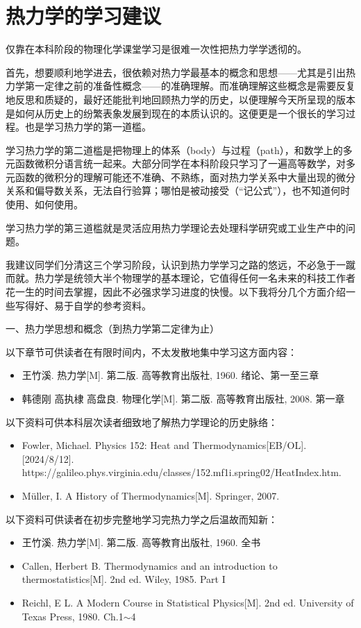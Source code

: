 \documentclass[main.tex]{subfiles}
\begin{document}
\section{热力学的学习建议}\label{I.1 learning_advices}
仅靠在本科阶段的物理化学课堂学习是很难一次性把热力学学透彻的。

首先，想要顺利地学进去，很依赖对热力学最基本的概念和思想——尤其是引出热力学第一定律之前的准备性概念——的准确理解。而准确理解这些概念是需要反复地反思和质疑的，最好还能批判地回顾热力学的历史，以便理解今天所呈现的版本是如何从历史上的纷繁表象发展到现在的本质认识的。这便更是一个很长的学习过程。也是学习热力学的第一道槛。

学习热力学的第二道槛是把物理上的体系（body）与过程（path），和数学上的多元函数微积分语言统一起来。大部分同学在本科阶段只学习了一遍高等数学，对多元函数的微积分的理解可能还不准确、不熟练，面对热力学关系中大量出现的微分关系和偏导数关系，无法自行验算；哪怕是被动接受（“记公式”），也不知道何时使用、如何使用。

学习热力学的第三道槛就是灵活应用热力学理论去处理科学研究或工业生产中的问题。

我建议同学们分清这三个学习阶段，认识到热力学学习之路的悠远，不必急于一蹴而就。热力学是统领大半个物理学的基本理论，它值得任何一名未来的科技工作者花一生的时间去掌握，因此不必强求学习进度的快慢。以下我将分几个方面介绍一些写得好、易于自学的参考资料。

一、热力学思想和概念（到热力学第二定律为止）

以下章节可供读者在有限时间内，不太发散地集中学习这方面内容：
\begin{itemize}
    \item 王竹溪. 热力学[M]. 第二版. 高等教育出版社, 1960. 绪论、第一至三章
    \item 韩德刚 高执棣 高盘良. 物理化学[M]. 第二版. 高等教育出版社, 2008. 第一章
\end{itemize}
以下资料可供本科层次读者细致地了解热力学理论的历史脉络：
\begin{itemize}
    \item Fowler, Michael. Physics 152: Heat and Thermodynamics[EB/OL]. [2024/8/12]. https://galileo.phys.virginia.edu/classes/152.mf1i.spring02/HeatIndex.htm.
    \item Müller, I. A History of Thermodynamics[M]. Springer, 2007.
\end{itemize}
以下资料可供读者在初步完整地学习完热力学之后温故而知新：
\begin{itemize}
    \item 王竹溪. 热力学[M]. 第二版. 高等教育出版社, 1960. 全书
    \item Callen, Herbert B. Thermodynamics and an introduction to thermostatistics[M]. 2nd ed. Wiley, 1985. Part I
    \item Reichl, E L. A Modern Course in Statistical Physics[M]. 2nd ed. University of Texas Press, 1980. Ch.1$\sim$4
\end{itemize}
\end{document}

